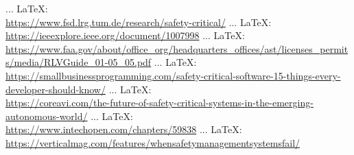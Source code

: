 \begin{thebibliography}{99}
{{{	 ... \LaTeX:\\ \url{https://www.fsd.lrg.tum.de/research/safety-critical/}
	 ... \LaTeX:\\ \url{https://ieeexplore.ieee.org/document/1007998}
	 ... \LaTeX:\\ \url{https://www.faa.gov/about/office_org/headquarters_offices/ast/licenses_permits/media/RLVGuide_01-05_05.pdf}
	 ... \LaTeX:\\ \url{https://smallbusinessprogramming.com/safety-critical-software-15-things-every-developer-should-know/}
	 ... \LaTeX:\\ \url{https://coreavi.com/the-future-of-safety-critical-systems-in-the-emerging-autonomous-world/}
	 ... \LaTeX:\\ \url{https://www.intechopen.com/chapters/59838}
	 ... \LaTeX:\\ \url{https://verticalmag.com/features/whensafetymanagementsystemsfail/}
	
}}}
\end{thebibliography}
